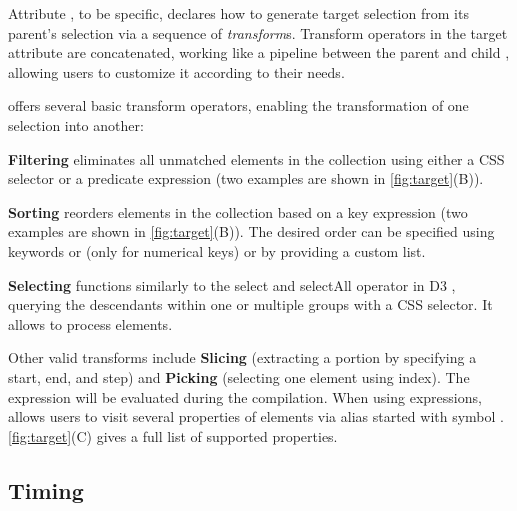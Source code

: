 Attribute , to be specific, declares how to generate target selection from its parent's selection via a sequence of \textit{transform}s.
Transform operators in the target attribute are concatenated, working like a pipeline between the parent and child \aniunit{}, allowing users to customize it according to their needs.


\gaia{} offers several basic transform operators, enabling the transformation of one selection into another:

\squishlist

\item \textbf{Filtering}
eliminates all unmatched elements in the collection using either a CSS selector or a predicate expression (two examples are shown in \autoref{fig:target}(B)).

\item \textbf{Sorting}
reorders elements in the collection based on a key expression (two examples are shown in \autoref{fig:target}(B)).
The desired order can be specified using keywords  or  (only for numerical keys) or by providing a custom list.

\item \textbf{Selecting}
functions similarly to the select and selectAll operator in D3 \cite{bostock2011d3}, querying the descendants within one or multiple groups with a CSS selector.
It allows \gaia{} to process  elements.


\squishend

Other valid transforms include \textbf{Slicing} (extracting a portion by specifying a start, end, and step) and \textbf{Picking} (selecting one element using index).
The expression will be evaluated during the compilation.
When using expressions, \gaia{} allows users to visit several properties of elements via alias started with symbol .
\autoref{fig:target}(C) gives a full list of supported properties.

\subsection{Timing}
\label{ssec:gaia_ani_timing}

